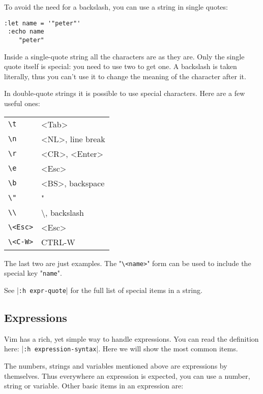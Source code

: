 To avoid the need for a backslash, you can use a string in single quotes:

\begin{Verbatim}[samepage=true]
 :let name = '"peter"'
 :echo name
    "peter"
\end{Verbatim}

Inside a single-quote string all the characters are as they are.
Only the single quote itself is special: you need to use two to get one.
A backslash is taken literally, thus you can't use it to change the meaning of the character after it.

In double-quote strings it is possible to use special characters.
Here are a few useful ones:

\begin{center} \begin{tabular}{l l}
		\texttt{\textbackslash{}t} & <Tab> \\
		\texttt{\textbackslash{}n} & <NL>, line break \\
		\texttt{\textbackslash{}r} & <CR>, <Enter> \\
		\texttt{\textbackslash{}e} & <Esc> \\
		\texttt{\textbackslash{}b} & <BS>, backspace \\
		\texttt{\textbackslash{}"} & " \\
		\texttt{\textbackslash{}\textbackslash{}} & \textbackslash{}, backslash \\
		\texttt{\textbackslash{}<Esc>} & <Esc> \\
		\texttt{\textbackslash{}<C-W>} & CTRL-W \\
\end{tabular} \end{center}

The last two are just examples.
The  "\texttt{\textbackslash{}<name>}" form can be used to include the special key "\texttt{name}".

See |\texttt{:h expr-quote}| for the full list of special items in a string.
\subsection{Expressions}
Vim has a rich, yet simple way to handle expressions.
You can read the definition here: |\texttt{:h expression-syntax}|.
Here we will show the most common items.

The numbers, strings and variables mentioned above are expressions by themselves.
Thus everywhere an expression is expected, you can use a number, string or variable.
Other basic items in an expression are:

